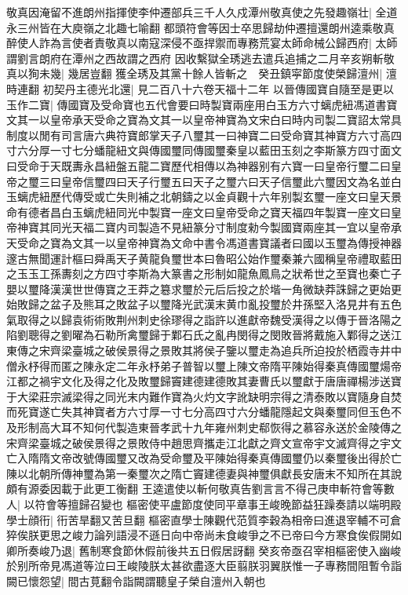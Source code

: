 敬真因淹留不進朗州指揮使李仲遷部兵三千人久戍潭州敬真使之先發趣嶺壮|{
	全道永三州皆在大庾嶺之北趣七喻翻}
都頭符會等因士卒思歸劫仲遷擅還朗州逵乘敬真醉使人詐為言使者責敬真以南寇深侵不亟捍禦而專務荒宴太師命械公歸西府|{
	太師謂劉言朗府在潭州之西故謂之西府}
因收繫獄全琇逃去遣兵追捕之二月辛亥朔斬敬真以狥未幾|{
	幾居豈翻}
獲全琇及其黨十餘人皆斬之　癸丑鎮寜節度使榮歸澶州|{
	澶時連翻}
初契丹主德光北還|{
	見二百八十六卷天福十二年}
以晉傳國寶自隨至是更以玉作二寶|{
	傳國寶及受命寶也五代會要曰時製寶兩座用白玉方六寸螭虎紐馮道書寶文其一以皇帝承天受命之寶為文其一以皇帝神寶為文宋白曰時内司製二寶詔太常具制度以閒有司言唐六典符寶郎掌天子八璽其一曰神寶二曰受命寶其神寶方六寸高四寸六分厚一寸七分蟠龍紐文與傳國璽同傳國璽秦皇以藍田玉刻之李斯篆方四寸面文曰受命于天既夀永昌紐盤五龍二寶歷代相傳以為神器别有六寶一曰皇帝行璽二曰皇帝之璽三曰皇帝信璽四曰天子行璽五曰天子之璽六曰天子信璽此六璽因文為名並白玉螭虎紐歷代傳受或亡失則補之北朝鑄之以金貞觀十六年别製玄璽一座文曰皇天景命有德者昌白玉螭虎紐同光中製寶一座文曰皇帝受命之寶天福四年製寶一座文曰皇帝神寶其同光天福二寶内司製造不見紐篆分寸制度勑今製國寶兩座其一宜以皇帝承天受命之寶為文其一以皇帝神寶為文命中書令馮道書寶議者曰國以玉璽為傳授神器邃古無聞運計樞曰舜禹天子黄龍負璽世本曰魯昭公始作璽秦兼六國稱皇帝禮取藍田之玉玉工孫夀刻之方四寸李斯為大篆書之形制如龍魚鳳鳥之狀希世之至寶也秦亡子嬰以璽降漢漢世世傳寶之王莽之簒求璽於元后后投之於堦一角微缺莽誅歸之更始更始敗歸之盆子及熊耳之敗盆子以璽降光武漢末黄巾亂投璽於井孫堅入洛見井有五色氣取得之以歸袁術術敗荆州刺史徐璆得之詣許以進獻帝魏受漢得之以傳于晉洛陽之陷劉聰得之劉曜為石勒所禽璽歸于鄴石氏之亂冉閔得之閔敗晉將戴施入鄴得之送江東傳之宋齊梁臺城之破侯景得之景敗其將侯子鑒以璽走為追兵所迫投於栖霞寺井中僧永杼得而匿之陳永定二年永杼弟子普智以璽上陳文帝隋平陳始得秦真傳國璽煬帝江都之禍宇文化及得之化及敗璽歸竇建德建德敗其妻曹氏以璽獻于唐唐禪楊涉送寶于大梁莊宗滅梁得之同光末内難作寶為火灼文字訛缺明宗得之清泰敗以寶隨身自焚而死寶遂亡失其神寶者方六寸厚一寸七分高四寸六分蟠龍隱起文與秦璽同但玉色不及形制高大耳不知何代製造東晉孝武十九年雍州刺史郗恢得之慕容永送於金陵傳之宋齊梁臺城之破侯景得之景敗侍中趙思齊攜走江北獻之齊文宣帝宇文滅齊得之宇文亡入隋隋文帝改號傳國璽又改為受命璽及平陳始得秦真傳國璽仍以秦璽後出得於亡陳以北朝所傳神璽為第一秦璽次之隋亡竇建德妻與神璽俱獻長安唐末不知所在其說頗有源委因載于此更工衡翻}
王逵遣使以斬何敬真告劉言言不得己庚申斬符會等數人|{
	以符會等擅歸召變也}
樞密使平盧節度使同平章事王峻晚節益狂躁奏請以端明殿學士顔衎|{
	衎苦旱翻又苦旦翻}
樞密直學士陳觀代范質李穀為相帝曰進退宰輔不可倉猝俟朕更思之峻力論列語浸不遜日向中帝尚未食峻爭之不已帝曰今方寒食俟假開如卿所奏峻乃退|{
	舊制寒食節休假前後共五日假居訝翻}
癸亥帝亟召宰相樞密使入幽峻於别所帝見馮道等泣曰王峻陵朕太甚欲盡逐大臣翦朕羽翼朕惟一子專務間阻暫令詣闕已懷怨望|{
	間古莧翻令詣闕謂聽皇子榮自澶州入朝也}
